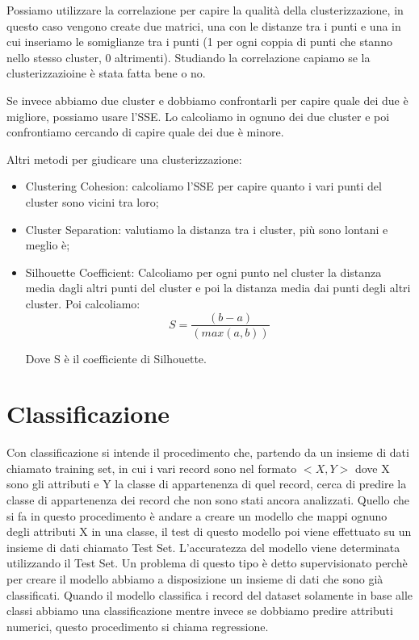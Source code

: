 \documentclass[14pt]{extreport}
\begin{document}
Possiamo utilizzare la correlazione per capire la qualità della clusterizzazione, in questo caso vengono create due matrici, una con le distanze tra i punti e una in cui inseriamo le somiglianze tra i punti (1 per ogni coppia di punti che stanno nello stesso cluster, 0 altrimenti). Studiando la correlazione capiamo se la clusterizzazioine è stata fatta bene o no.

Se invece abbiamo due cluster e dobbiamo confrontarli per capire quale dei due è migliore, possiamo usare l'SSE. Lo calcoliamo in ognuno dei due cluster e poi confrontiamo cercando di capire quale dei due è minore.

Altri metodi per giudicare una clusterizzazione:

\begin{itemize}
    \item Clustering Cohesion: calcoliamo l'SSE per capire quanto i vari punti del cluster sono vicini tra loro;
    \item Cluster Separation: valutiamo la distanza tra i cluster, più sono lontani e meglio è;
    \item Silhouette Coefficient: Calcoliamo per ogni punto nel cluster la distanza media dagli altri punti del cluster e poi la distanza media dai punti degli altri cluster. Poi calcoliamo:
    \newline
     \begin{equation}
            S = \frac{(b-a)}{(max(a,b))}
    \end{equation}
    
    Dove S è il coefficiente di Silhouette.
    
\end{itemize}

\chapter{Classificazione}

Con classificazione si intende il procedimento che, partendo da un insieme di dati chiamato training set, in cui i vari record sono nel formato $<X, Y>$ dove X sono gli attributi e Y la classe di appartenenza di quel record, cerca di predire la classe di appartenenza dei record che non sono stati ancora analizzati.
Quello che si fa in questo procedimento è andare a creare un modello che mappi ognuno degli attributi X in una classe, il test di questo modello poi viene effettuato su un insieme di dati chiamato Test Set. L'accuratezza del modello viene determinata utilizzando il Test Set.
Un problema di questo tipo è detto supervisionato perchè per creare il modello abbiamo a disposizione un insieme di dati che sono già classificati. 
Quando il modello classifica i record del dataset solamente in base alle classi abbiamo una classificazione mentre invece se dobbiamo predire attributi numerici, questo procedimento si chiama regressione.
\end{document}
